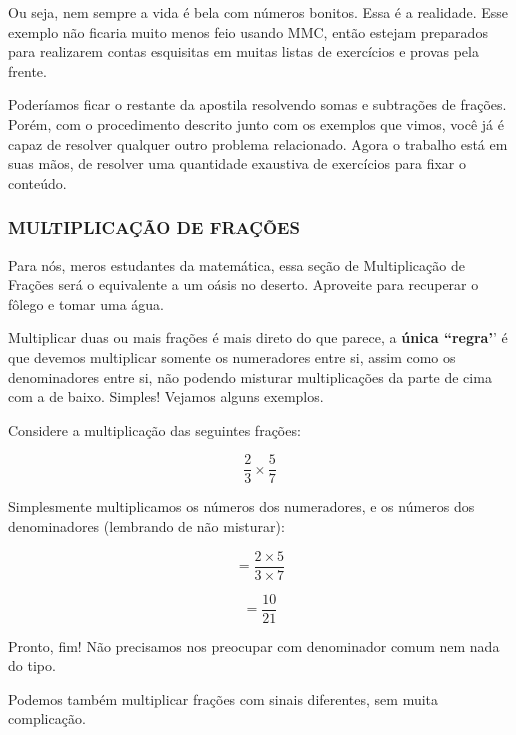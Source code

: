 Ou seja, nem sempre a vida é bela com números bonitos. Essa é a realidade. Esse exemplo não ficaria muito menos feio usando MMC, então estejam preparados para realizarem contas esquisitas em muitas listas de exercícios e provas pela frente.

Poderíamos ficar o restante da apostila resolvendo somas e subtrações de frações. Porém, com o procedimento descrito junto com os exemplos que vimos, você já é capaz de resolver qualquer outro problema relacionado. Agora o trabalho está em suas mãos, de resolver uma quantidade exaustiva de exercícios para fixar o conteúdo.

\subsubsection{MULTIPLICAÇÃO DE FRAÇÕES}

Para nós, meros estudantes da matemática, essa seção de Multiplicação de Frações será o equivalente a um oásis no deserto. Aproveite para recuperar o fôlego e tomar uma água.

Multiplicar duas ou mais frações é mais direto do que parece, a \textbf{única ``regra'}' é que devemos multiplicar somente os numeradores entre si, assim como os denominadores entre si, não podendo misturar multiplicações da parte de cima com a de baixo. Simples! Vejamos alguns exemplos.

\begin{exemplo}
    Considere a multiplicação das seguintes frações:

    \begin{equation}
        \frac{2}{3}\times\frac{5}{7}
    \end{equation}

    Simplesmente multiplicamos os números dos numeradores, e os números dos denominadores (lembrando de não misturar):

    \begin{equation}
        =\frac{2\times5}{3\times7}
    \end{equation}

    \begin{equation}
        =\frac{10}{21}
    \end{equation}

    Pronto, fim! Não precisamos nos preocupar com denominador comum nem nada do tipo.
\end{exemplo}

Podemos também multiplicar frações com sinais diferentes, sem muita complicação.

